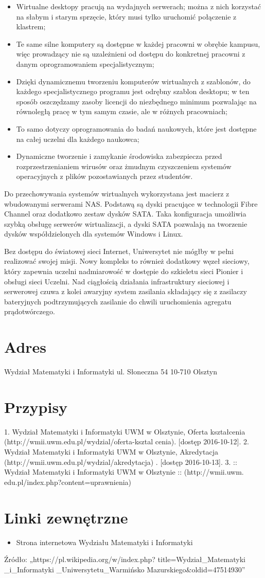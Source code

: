 \documentclass[a4paper,12pt]{article}
\begin{document}
\begin{itemize}
\item Wirtualne desktopy pracują na wydajnych serwerach; można z nich korzystać na słabym i starym
sprzęcie, który musi tylko uruchomić połączenie z klastrem;
\item Te same silne komputery są dostępne w każdej pracowni w obrębie kampusu, więc prowadzący nie są
uzależnieni od dostępu do konkretnej pracowni z danym oprogramowaniem specjalistycznym;
\item Dzięki dynamicznemu tworzeniu komputerów wirtualnych z szablonów, do każdego specjalistycznego
programu jest odrębny szablon desktopu; w ten sposób oszczędzamy zasoby licencji do niezbędnego
minimum pozwalając na równoległą pracę w tym samym czasie, ale w różnych pracowniach;
\item To samo dotyczy oprogramowania do badań naukowych, które jest dostępne na całej uczelni dla każdego
naukowca;
\item Dynamiczne tworzenie i zamykanie środowiska zabezpiecza przed rozprzestrzenianiem wirusów oraz
żmudnym czyszczeniem systemów operacyjnych z plików pozostawianych przez studentów.
\end{itemize}
{}Do przechowywania systemów wirtualnych wykorzystana jest macierz z wbudowanymi serwerami NAS.
Podstawą są dyski pracujące w technologii Fibre Channel oraz dodatkowo zestaw dysków SATA. Taka
konfiguracja umożliwia szybką obsługę serwerów wirtualizacji, a dyski SATA pozwalają na tworzenie dysków
współdzielonych dla systemów Windows i Linux.

{} Bez dostępu do światowej sieci Internet, Uniwersytet nie mógłby w pełni realizować swojej misji. Nowy
kompleks to również dodatkowy węzeł sieciowy, który zapewnia uczelni nadmiarowość w dostępie do
szkieletu sieci Pionier i obsługi sieci Uczelni. Nad ciągłością działania infrastruktury sieciowej i serwerowej
czuwa z kolei awaryjny system zasilania składający się z zasilaczy bateryjnych podtrzymujących zasilanie do
chwili uruchomienia agregatu prądotwórczego.


\section{Adres}
{}Wydział Matematyki i Informatyki
{}ul. Słoneczna 54
{}10-710 Olsztyn

\section{Przypisy}
1. Wydział Matematyki i Informatyki UWM w Olsztynie, Oferta kształcenia (http://wmii.uwm.edu.pl/wydzial/oferta-ksztal
cenia). [dostęp 2016-10-12].
2. Wydział Matematyki i Informatyki UWM w Olsztynie, Akredytacja (http://wmii.uwm.edu.pl/wydzial/akredytacja) .
[dostęp 2016-10-13].
3. :: Wydział Matematyki i Informatyki UWM w Olsztynie :: (http://wmii.uwm.
edu.pl/index.php?content=uprawnienia)

\section{Linki zewnętrzne}
\begin{itemize}
\item Strona internetowa Wydziału Matematyki i Informatyki
\end{itemize}
{}Źródło: „https://pl.wikipedia.org/w/index.php?
title=Wydział\_Matematyki
\_i\_Informatyki
\_Uniwersytetu\_Warmińsko
\-Mazurskiego\&oldid=47514930”
\end{document}
